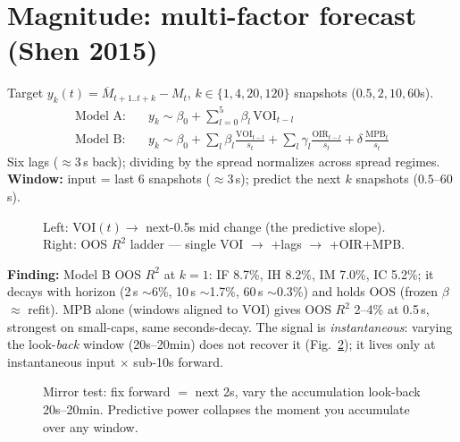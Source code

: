 \documentclass[11pt]{article}
\begin{document}
\section{Magnitude: multi-factor forecast (Shen 2015)}
Target $y_k(t)=\overline{M}_{t+1..t+k}-M_t$, $k\in\{1,4,20,120\}$ snapshots ($0.5,2,10,60$s).
\begin{align*}
\text{Model A:}\quad & y_k \sim \beta_0 + \textstyle\sum_{l=0}^{5}\beta_l\,\text{VOI}_{t-l}\\
\text{Model B:}\quad & y_k \sim \beta_0 + \textstyle\sum_l \beta_l\tfrac{\text{VOI}_{t-l}}{s_t}
      + \sum_l \gamma_l \tfrac{\text{OIR}_{t-l}}{s_t} + \delta\,\tfrac{\text{MPB}_t}{s_t}
\end{align*}
Six lags ($\approx$3\,s back); dividing by the spread normalizes across spread regimes.
\\ \textbf{Window:} input = last 6 snapshots ($\approx$3\,s); predict the next $k$ snapshots ($0.5$--$60$\,s).
\begin{figure}[H]\centering
  \caption{Left: VOI$(t)\to$ next-0.5s mid change (the predictive slope). Right: OOS $R^2$
  ladder --- single VOI $\to$ +lags $\to$ +OIR+MPB.}
  \label{fig:voi}
\end{figure}
\textbf{Finding:} Model B OOS $R^2$ at $k{=}1$: IF 8.7\%, IH 8.2\%, IM 7.0\%, IC 5.2\%; it
decays with horizon (2\,s $\sim$6\%, 10\,s $\sim$1.7\%, 60\,s $\sim$0.3\%) and holds OOS
(frozen $\beta$ $\approx$ refit). MPB alone (windows aligned to VOI) gives OOS $R^2$ 2--4\%
at 0.5\,s, strongest on small-caps, same seconds-decay.
The signal is \emph{instantaneous}: varying the look-\emph{back} window (20s--20min) does not
recover it (Fig.~\ref{fig:lookback}); it lives only at instantaneous input $\times$ sub-10s forward.
\begin{figure}[H]\centering
  \caption{Mirror test: fix forward $=$ next 2s, vary the accumulation look-back 20s--20min.
  Predictive power collapses the moment you accumulate over any window.}
  \label{fig:lookback}
\end{figure}
\end{document}
